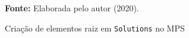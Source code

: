 \begin{figure}[ht!]
\centering

\caption{\textmd{Criação de elementos raiz em  \texttt{Solutions} no \gls{MPS}}}
\label{fig:solutions}

\par\medskip\textbf{Fonte:} Elaborada pelo autor (2020). \par\medskip

\end{figure}

